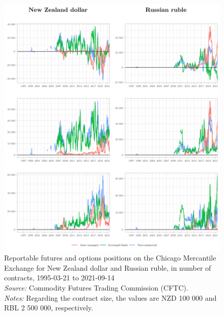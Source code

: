 \documentclass[a4paper, twoside]{templates/ociamthesis}
\begin{document}
\begin{figure}[!ht]

{\centering \includegraphics[width=0.99\columnwidth]{figure/GTOG_NZDRBL} 

}

\caption[Reportable futures and options positions on the Chicago Mercantile Exchange for New Zealand dollar and Russian ruble, in number of contracts, 1995-03-21 to 2021-09-14]{Reportable futures and options positions on the Chicago Mercantile Exchange for New Zealand dollar and Russian ruble, in number of contracts, 1995-03-21 to 2021-09-14 \\ \scriptsize \textit{Source:} Commodity Futures Trading Commission (CFTC). \\ \scriptsize \textit{Notes:} Regarding the contract size, the values are NZD 100 000 and RBL 2 500 000, respectively.}\label{fig:FigureA34}
\end{figure}

\clearpage
\end{document}
